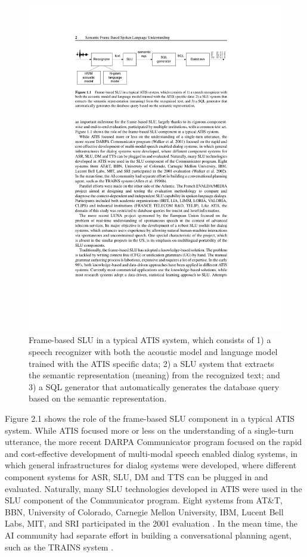 \begin{figure}[h]
	\centering
	\includegraphics[width=\textwidth]{fig/atis-seq}
\caption[Frame based SLU in a typical ATIS system]{Frame-based SLU in a typical ATIS system, which consists of 1) a speech recognizer with both the acoustic model and language model trained with the ATIS specific data; 2) a SLU system that extracts the semantic representation (meaning) from the recognized text; and 3) a SQL generator that automatically generates the database query based on the semantic representation.}
\end{figure}


Figure 2.1 shows the role of the frame-based SLU component in a typical ATIS system.
While ATIS focused more or less on the understanding of a single-turn utterance, the
more recent DARPA Communicator program \cite{d1e358} focused on the rapid and
cost-effective development of multi-modal speech enabled dialog systems, in which general
infrastructures for dialog systems were developed, where different component systems for
ASR, SLU, DM and TTS can be plugged in and evaluated. Naturally, many SLU technologies
developed in ATIS were used in the SLU component of the Communicator program. Eight
systems from AT\&T, BBN, University of Colorado, Carnegie Mellon University, IBM,
Lucent Bell Labs, MIT, and SRI participated in the 2001 evaluation \cite{d1e411}.
In the mean time, the AI community had separate effort in building a conversational planning
agent, such as the TRAINS system \cite{d1e5}.

